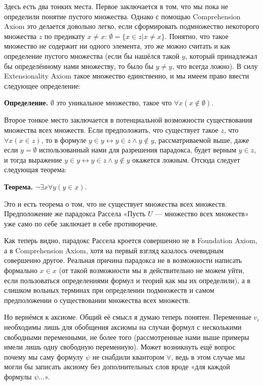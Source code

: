 Здесь есть два тонких места. Первое заключается в том, что мы пока не определили понятие пустого множества. Однако с помощью Comprehension Axiom это делается довольно легко, если сформировать подмножество некоторого множества $z$ по предикату $x \not= x$: $\emptyset = \{x \in z |x \not= x\}$. Понятно, что такое множество не содержит ни одного элемента, это же можно считать и как определение пустого множества (если бы нашёлся такой $y$, который принадлежал бы определённому нами множеству, то было бы $y\not= y$, что всегда ложно). В силу Extensionality Axiom такое множество единственно, и мы имеем право ввести следующее определение:

{\bfseries Определение.} $\emptyset$ это уникальное множество, такое что $\forall x (x\not\in \emptyset)$.

Второе тонкое место заключается в потенциальной возможности существования множества всех множеств. Если предположить, что существует такое $z$, что $\forall x (x \in z)$, то в формуле $y \in y \leftrightarrow y\in z \wedge y \not \in y$, рассматриваемой выше, даже если $y = \emptyset$ использованный нами для разрешения парадокса, будет верным $y \in z$, и тогда выражение $y \in y \leftrightarrow y\in z \wedge y \not \in y$ окажется ложным. Отсюда следует следующая теорема:

{\bfseries Теорема.} $\neg \exists x \forall y (y \in x)$.

Это и есть теорема о том, что не существует множества всех множеств. Предположение же парадокса Рассела «Пусть $U$ — множество всех множеств» уже само по себе заключает в себе противоречие.

Как теперь видно, парадокс Рассела кроется совершенно не в Foundation Axiom, а в Comprehension Axiom, хотя на первый взгляд казалось очевидным совершенно другое. Реальная причина парадокса не в возможности написать формально $x\in x$ (от такой возможности мы в действительно не можем уйти, если пользоваться определениями формул и теорий как мы их определили), а в слишком вольных терминах при определении подмножеств и самом предположении о существовании множества всех множеств.

Но вернёмся к аксиоме. Общий её смысл я думаю теперь понятен. Переменные $v_i$ необходимы лишь для обобщения аксиомы на случаи формул с несколькими свободными переменными, не более того (рассмотренные нами выше примеры имели лишь одну свободную переменную). Может возникнуть ещё вопрос почему мы саму формулу $\psi$ не снабдили квантором $\forall$, ведь в этом случае мы могли бы записать аксиому без дополнительных слов вроде «для каждой формулы $\psi$...».

